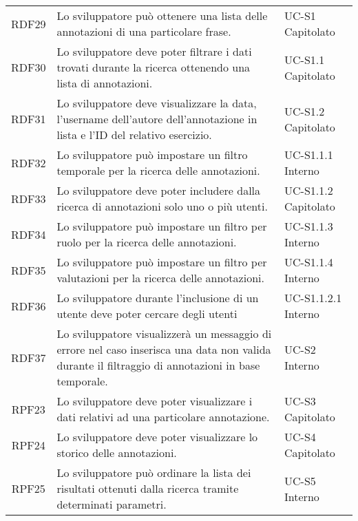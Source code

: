 \begin{tabularx}{\textwidth}{| c | p{10cm} | X |}
		RDF29 & Lo sviluppatore può ottenere una lista delle annotazioni di una particolare frase. & UC-S1 \newline Capitolato\\
		RDF30 & Lo sviluppatore deve poter filtrare i dati trovati durante la ricerca ottenendo una lista di annotazioni. & UC-S1.1 \newline Capitolato\\
		RDF31 & Lo sviluppatore deve visualizzare la data, l'username dell'autore dell'annotazione in lista e l'ID del relativo esercizio. & UC-S1.2 \newline Capitolato\\
		RDF32 & Lo sviluppatore può impostare un filtro temporale per la ricerca delle annotazioni. & UC-S1.1.1 \newline Interno\\
		RDF33 & Lo sviluppatore deve poter includere dalla ricerca di annotazioni solo uno o più utenti. & UC-S1.1.2 \newline Capitolato\\
		RDF34 & Lo sviluppatore può impostare un filtro per ruolo per la ricerca delle annotazioni. & UC-S1.1.3 \newline Interno\\
		RDF35 & Lo sviluppatore può impostare un filtro per valutazioni per la ricerca delle annotazioni. & UC-S1.1.4 \newline Interno\\
		RDF36 & Lo sviluppatore durante l'inclusione di un utente deve poter cercare degli utenti & UC-S1.1.2.1 \newline Interno\\		
		RDF37 & Lo sviluppatore visualizzerà un messaggio di errore nel caso inserisca una data non valida durante il filtraggio di annotazioni in base temporale. & UC-S2 \newline Interno\\
		RPF23 & Lo sviluppatore deve poter visualizzare i dati relativi ad una particolare annotazione. & UC-S3 \newline Capitolato\\
		RPF24 & Lo sviluppatore deve poter visualizzare lo storico delle annotazioni. & UC-S4 \newline Capitolato\\
		RPF25 & Lo sviluppatore può ordinare la lista dei risultati ottenuti dalla ricerca tramite determinati parametri. & UC-S5 \newline Interno\\	

\end{tabularx}

